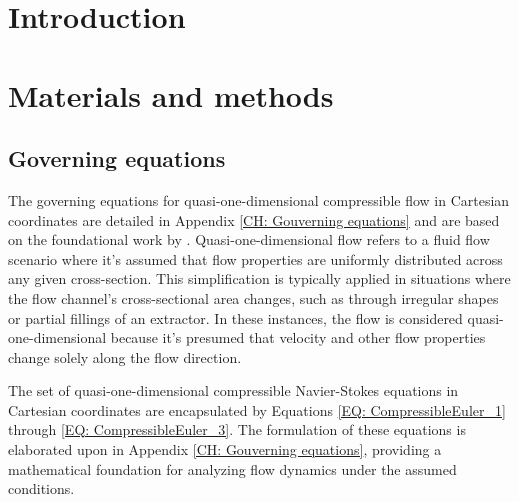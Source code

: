 \documentclass[a4paper,fleqn]{cas-dc}
\begin{document}

\section{Introduction}


\section{Materials and methods} \label{CH: Materials and methods}

%

\subsection{Governing equations} \label{CH:Governing_equations_chapter}
	The governing equations for quasi-one-dimensional compressible flow in Cartesian coordinates are detailed in Appendix \ref{CH: Gouverning equations} and are based on the foundational work by \citet{Anderson1995}. Quasi-one-dimensional flow refers to a fluid flow scenario where it's assumed that flow properties are uniformly distributed across any given cross-section. This simplification is typically applied in situations where the flow channel's cross-sectional area changes, such as through irregular shapes or partial fillings of an extractor. In these instances, the flow is considered quasi-one-dimensional because it's presumed that velocity and other flow properties change solely along the flow direction.
	
	The set of quasi-one-dimensional compressible Navier-Stokes equations in Cartesian coordinates are encapsulated by Equations \ref{EQ: CompressibleEuler_1} through \ref{EQ: CompressibleEuler_3}. The formulation of these equations is elaborated upon in Appendix \ref{CH: Gouverning equations}, providing a mathematical foundation for analyzing flow dynamics under the assumed conditions.
\end{document}
